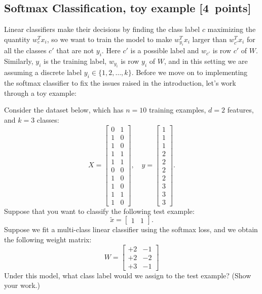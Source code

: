 \documentclass{article}
\newcommand{\blu}[1]{{\textcolor{blu}{#1}}}
\let\ask\blu
\newcommand\pts[1]{\textcolor{pointscolour}{[#1~points]}}
\begin{document}
\subsection{Softmax Classification, toy example \pts{4}}

Linear classifiers make their decisions by finding the class label $c$ maximizing the quantity $w_c^Tx_i$, so we want to train the model to make $w_{y_i}^Tx_i$ larger than $w_{c'}^Tx_i$ for all the classes $c'$ that are not $y_i$.
Here $c'$ is a possible label and $w_{c'}$ is row $c'$ of $W$. Similarly, $y_i$ is the training label, $w_{y_i}$ is row $y_i$ of $W$, and in this setting we are assuming a discrete label $y_i \in \{1,2,\dots,k\}$. Before we move on to implementing the softmax classifier to fix the issues raised in the introduction, let's work through a toy example:

Consider the dataset below, which has $n=10$ training examples, $d=2$ features, and $k=3$ classes:
\[
X = \begin{bmatrix}0 & 1\\1 & 0\\ 1 & 0\\ 1 & 1\\ 1 & 1\\ 0 & 0\\  1 & 0\\  1 & 0\\  1 & 1\\  1 &0\end{bmatrix}, \quad y = \begin{bmatrix}1\\1\\1\\2\\2\\2\\2\\3\\3\\3\end{bmatrix}.
\]
Suppose that you want to classify the following test example:
\[
\tilde{x} = \begin{bmatrix}1 & 1\end{bmatrix}.
\]
Suppose we fit a multi-class linear classifier using the softmax loss, and we obtain the following weight matrix:
\[
W =
\begin{bmatrix}
+2 & -1\\
+2 & -2\\
+3 & -1
\end{bmatrix}
\]
\ask{Under this model, what class label would we assign to the test example? (Show your work.)}
\end{document}
